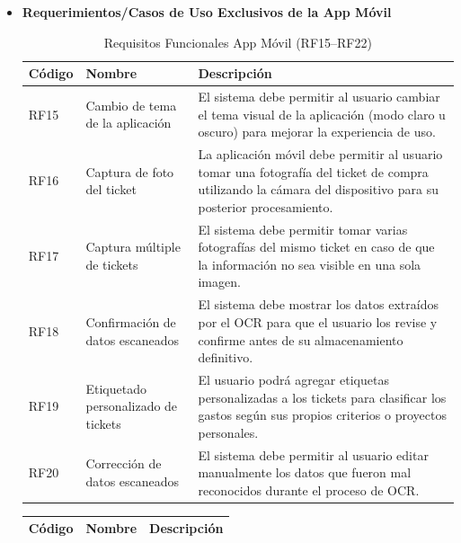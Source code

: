\begin{itemize}
    \item \textbf{Requerimientos/Casos de Uso Exclusivos de la App Móvil} 
    
    \begin{table}[H]
    \centering
    \renewcommand{\arraystretch}{1.2}
    \begin{tabularx}{\textwidth}{@{} l l X @{}}
    \toprule
    \textbf{Código} & \textbf{Nombre} & \textbf{Descripción} \\
    \midrule
    RF15 & Cambio de tema de la aplicación &
    El sistema debe permitir al usuario cambiar el tema visual de la aplicación (modo claro u oscuro) para mejorar la experiencia de uso. \\

    RF16 & Captura de foto del ticket &
    La aplicación móvil debe permitir al usuario tomar una fotografía del ticket de compra utilizando la cámara del dispositivo para su posterior procesamiento. \\

    RF17 & Captura múltiple de tickets &
    El sistema debe permitir tomar varias fotografías del mismo ticket en caso de que la información no sea visible en una sola imagen. \\

    RF18 & Confirmación de datos escaneados &
    El sistema debe mostrar los datos extraídos por el OCR para que el usuario los revise y confirme antes de su almacenamiento definitivo. \\

    RF19 & Etiquetado personalizado de tickets &
    El usuario podrá agregar etiquetas personalizadas a los tickets para clasificar los gastos según sus propios criterios o proyectos personales. \\

    RF20 & Corrección de datos escaneados &
    El sistema debe permitir al usuario editar manualmente los datos que fueron mal reconocidos durante el proceso de OCR. \\

    \bottomrule
    \end{tabularx}
    \caption{Requisitos Funcionales App Móvil (RF15–RF22)}
    \end{table}

    \begin{table}[H]
    \centering
    \renewcommand{\arraystretch}{1.2}
    \begin{tabularx}{\textwidth}{@{} l l X @{}}
    \toprule
    \textbf{Código} & \textbf{Nombre} & \textbf{Descripción} \\
    \midrule
    

\end{tabularx}
\end{table}
\end{itemize}
